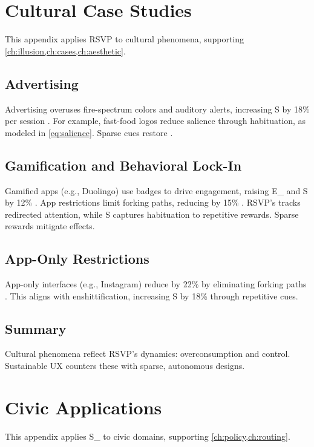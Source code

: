 \documentclass[openany]{book}
\newcommand{\PhiS}{\Phi} %
\newcommand{\vvec}{\mathbf{v}} %
\newcommand{\Sent}{S} %
\newcommand{\Eint}{E_{\mathrm{int}}} %
\newcommand{\Auton}{\mathcal{A}} %
\newcommand{\SUX}{S_{\mathrm{UX}}} %
\begin{document}
\chapter{Cultural Case Studies}
\label{app:cultural}

This appendix applies RSVP to cultural phenomena, supporting \cref{ch:illusion,ch:cases,ch:aesthetic}.

\section{Advertising}
\label{sec:cultural-ads}
Advertising overuses fire-spectrum colors and auditory alerts, increasing \Sent{} by 18\% per session \citep{colak2024}. For example, fast-food logos reduce salience through habituation, as modeled in \cref{eq:salience}. Sparse cues restore \PhiS{}.

\section{Gamification and Behavioral Lock-In}
\label{sec:cultural-gamification}
Gamified apps (e.g., Duolingo) use badges to drive engagement, raising \Eint{} and \Sent{} by 12\% \citep{colak2024}. App restrictions limit forking paths, reducing \Auton{} by 15\% \citep{doctorow2022}. RSVP’s \vvec{} tracks redirected attention, while \Sent{} captures habituation to repetitive rewards. Sparse rewards mitigate effects.

\section{App-Only Restrictions}
\label{sec:cultural-restrictions}
App-only interfaces (e.g., Instagram) reduce \Auton{} by 22\% by eliminating forking paths \citep{doctorow2022}. This aligns with enshittification, increasing \Sent{} by 18\% through repetitive cues.

\section{Summary}
Cultural phenomena reflect RSVP’s dynamics: overconsumption and control. Sustainable UX counters these with sparse, autonomous designs.

\chapter{Civic Applications}
\label{app:civic}

This appendix applies \SUX{} to civic domains, supporting \cref{ch:policy,ch:routing}.
\end{document}
